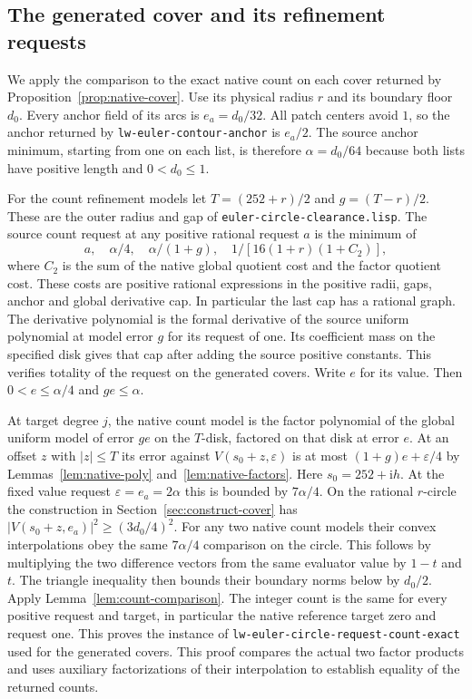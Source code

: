 \documentclass[11pt]{amsart}
\theoremstyle{definition}
\theoremstyle{remark}
\numberwithin{equation}{section}
\newcommand{\code}[1]{\nolinkurl{#1}}
\begin{document}
\subsection{The generated cover and its refinement requests}

We apply the comparison to the exact native count on each
cover returned by Proposition~\ref{prop:native-cover}.
Use its physical radius $r$ and its boundary floor $d_0$.
Every anchor field of its arcs is $e_a=d_0/32$.
All patch centers avoid $1$, so the anchor returned by
\code{lw-euler-contour-anchor} is $e_a/2$.
The source anchor minimum, starting from one on each list,
is therefore $\alpha=d_0/64$ because both lists have
positive length and $0<d_0\le1$.

For the count refinement models let
$T=(252+r)/2$ and $g=(T-r)/2$. These are the outer
radius and gap of \code{euler-circle-clearance.lisp}.
The source count request at any positive rational
request $a$ is the minimum of
\[
    a,\quad \alpha/4,\quad \alpha/(1+g),\quad
           1/[16(1+r)(1+C_2)],
\]
where $C_2$ is the sum of the native global quotient cost
and the factor quotient cost. These costs are positive
rational expressions in the positive radii, gaps, anchor and
global derivative cap. In particular the last cap has a
rational graph. The derivative polynomial is the formal
derivative of the source uniform polynomial at model error
$g$ for its request of one. Its coefficient mass on the
specified disk gives that cap after adding the source
positive constants. This verifies totality of the request
on the generated covers. Write $e$ for its value.
Then $0<e\le\alpha/4$ and $ge\le\alpha$.

At target degree $j$, the native count model is the
factor polynomial of the global uniform model of error $ge$
on the $T$-disk, factored on that disk at error $e$.
At an offset $z$ with $|z|\le T$ its error against
$V(s_0+z,\varepsilon)$ is at most
$(1+g)e+\varepsilon/4$ by
Lemmas~\ref{lem:native-poly} and~\ref{lem:native-factors}.
Here $s_0=252+\mathrm i h$. At the fixed value request
$\varepsilon=e_a=2\alpha$ this is bounded by
$7\alpha/4$. On the rational $r$-circle
the construction in Section~\ref{sec:construct-cover}
has $|V(s_0+z,e_a)|^2\ge(3d_0/4)^2$.
For any two native count models their convex
interpolations obey the same $7\alpha/4$ comparison on
the circle. This follows by multiplying the two difference
vectors from the same evaluator value by $1-t$ and $t$.
The triangle inequality then bounds their boundary norms
below by $d_0/2$. Apply Lemma~\ref{lem:count-comparison}.
The integer count is the same for every positive request
and target, in particular the native reference target zero
and request one. This proves the instance of
\code{lw-euler-circle-request-count-exact} used for the
generated covers. This proof compares the actual two
factor products and uses auxiliary factorizations of their
interpolation to establish equality of the returned counts.
\end{document}
